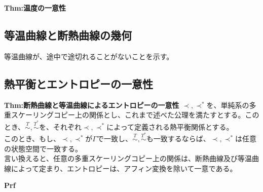 \documentclass[a4paper,11pt]{jsarticle}
\numberwithin{equation}{section}
\begin{document}
\begin{itembox}[l]{\textbf{Thm:温度の一意性}}

\end{itembox}
\subsection{等温曲線と断熱曲線の幾何}
等温曲線が、途中で途切れることがないことを示す。\\  

\subsection{熱平衡とエントロピーの一意性}
\begin{itembox}[l]{\textbf{Thm:断熱曲線と等温曲線によるエントロピーの一意性}}
    $\prec,\prec^{*}$を、単純系の多重スケーリングコピー上の関係とし、これまで述べた公理を満たすとする。このとき、$\overset{T}{\sim},\overset{T^{*}}{\sim}$を、それぞれ$\prec,\prec^{*}$によって定義される熱平衡関係とする。\\
    このとき、もし、$\prec,\prec^{*}$が$\Gamma$で一致し、$\overset{T}{\sim},\overset{T^{*}}{\sim}$も一致するならば、$\prec,\prec^{*}$は任意の状態空間で一致する。\\
    言い換えると、任意の多重スケーリングコピー上の関係は、断熱曲線及び等温曲線によって定まり、エントロピーは、アフィン変換を除いて一意である。
\end{itembox}
\textbf{Prf}\\
\end{document}
